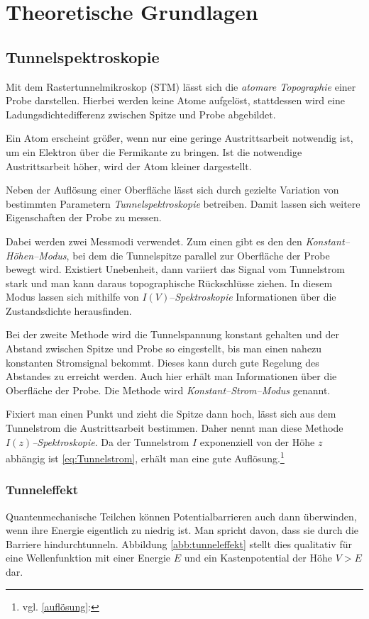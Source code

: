 \documentclass[12pt,a4paper]{scrartcl}
\numberwithin{equation}{section} %
\begin{document}
\clearpage
\hypertarget{theoretische-grundlagen}{%
\section{Theoretische Grundlagen}\label{theoretische-grundlagen}}
\hypertarget{tunnelspektroskopie}{%
\subsection{Tunnelspektroskopie}\label{tunnelspektroskopie}}
Mit dem Rastertunnelmikroskop (STM) lässt sich die \textit{atomare Topographie} einer Probe darstellen. Hierbei werden keine Atome aufgelöst, stattdessen wird eine Ladungsdichtedifferenz zwischen Spitze und Probe abgebildet.

Ein Atom erscheint größer, wenn nur eine geringe Austrittsarbeit notwendig ist, um ein Elektron
über die Fermikante zu bringen. Ist die notwendige Austrittsarbeit höher, wird der Atom kleiner dargestellt.

Neben der Auflösung einer Oberfläche lässt sich durch gezielte Variation von bestimmten Parametern \textit{Tunnelspektroskopie} betreiben. Damit lassen sich weitere Eigenschaften der Probe zu messen.

Dabei werden zwei Messmodi verwendet. Zum einen gibt es den den \textit{Konstant--Höhen--Modus}, bei dem die Tunnelspitze parallel zur Oberfläche der Probe bewegt wird. Existiert Unebenheit, dann variiert das Signal vom Tunnelstrom stark und man kann daraus topographische Rückschlüsse ziehen. In diesem Modus lassen sich mithilfe von $I(V)$--\textit{Spektroskopie} Informationen über die Zustandsdichte herausfinden.

Bei der zweite Methode wird die Tunnelspannung konstant gehalten und der Abstand zwischen Spitze und Probe so eingestellt, bis man einen nahezu konstanten Stromsignal bekommt. Dieses kann durch gute Regelung des Abstandes zu erreicht werden. Auch hier erhält man Informationen über die Oberfläche der Probe. Die Methode wird \textit{Konstant--Strom--Modus} genannt.

Fixiert man einen Punkt und zieht die Spitze dann hoch, lässt sich aus dem Tunnelstrom die Austrittsarbeit bestimmen. Daher nennt man diese Methode \textit{$I(z)$--Spektroskopie}. Da der Tunnelstrom $I$ exponenziell von der Höhe $z$ abhängig ist \eqref{eq:Tunnelstrom}, erhält man eine gute Auflösung.\footnote{vgl. \ref{auflösung}: }

\hypertarget{tunneleffekt}{%
\subsubsection{Tunneleffekt}\label{tunneleffekt}}
Quantenmechanische Teilchen können Potentialbarrieren auch dann überwinden, wenn ihre Energie eigentlich zu niedrig ist. Man spricht davon, dass sie durch die Barriere hindurchtunneln. Abbildung \ref{abb:tunneleffekt} stellt dies qualitativ für eine Wellenfunktion mit einer Energie $E$ und ein Kastenpotential der Höhe $V>E$ dar.
\end{document}
